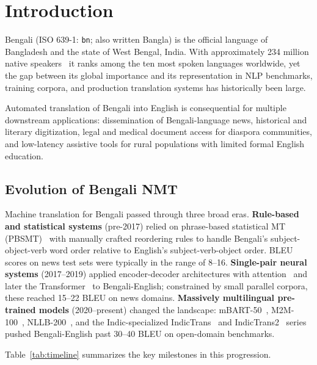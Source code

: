 \documentclass[conference]{IEEEtran}
\begin{document}
\section{Introduction}
\label{sec:intro}

Bengali (ISO 639-1: \texttt{bn}; also written Bangla) is the official
language of Bangladesh and the state of West Bengal, India.
With approximately 234 million native speakers~\cite{ethnologue2023} it
ranks among the ten most spoken languages worldwide, yet the gap between
its global importance and its representation in NLP benchmarks, training
corpora, and production translation systems has historically been large.

Automated translation of Bengali into English is consequential for
multiple downstream applications: dissemination of Bengali-language news,
historical and literary digitization, legal and medical document access
for diaspora communities, and low-latency assistive tools for rural
populations with limited formal English education.

\subsection{Evolution of Bengali NMT}

Machine translation for Bengali passed through three broad eras.
\textbf{Rule-based and statistical systems} (pre-2017) relied on
phrase-based statistical MT (PBSMT)~\cite{koehn2007moses} with manually
crafted reordering rules to handle Bengali's subject-object-verb word
order relative to English's subject-verb-object order.
BLEU scores on news test sets were typically in the range of 8--16.
\textbf{Single-pair neural systems} (2017--2019) applied encoder-decoder
architectures with attention~\cite{bahdanau2015neural} and later the
Transformer~\cite{vaswani2017attention} to Bengali-English; constrained
by small parallel corpora, these reached 15--22 BLEU on news domains.
\textbf{Massively multilingual pre-trained models} (2020--present) changed
the landscape: mBART-50~\cite{liu2020mbart50}, M2M-100~\cite{fan2021m2m100},
NLLB-200~\cite{nllb2022}, and the Indic-specialized
IndicTrans~\cite{ramesh2022samanantar} and
IndicTrans2~\cite{gala2023indictrans2} series pushed Bengali-English past
30--40 BLEU on open-domain benchmarks.

Table~\ref{tab:timeline} summarizes the key milestones in this progression.
\end{document}
